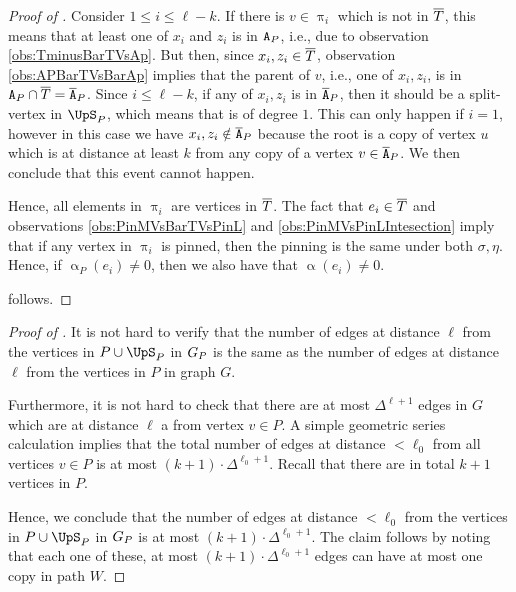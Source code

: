 \documentclass[11pt,reqno]{amsart}
\numberwithin{equation}{section}
\newcommand{\applegreen}[1]{ {\color{applegreen}#1}}
\newcommand{\blue}[1]{{\color{blue}#1}}
\newcommand{\bluepigment}[1]{{\color{blue(pigment)}#1}}
\newcommand{\capri}[1]{{\color{capri}#1}}
\newcommand{\cadmiumgreen}[1]{{\color{cadmiumgreen}#1}}
\newcommand{\electricviolet}[1]{{\color{electricviolet}#1}}
\newcommand{\goldenbrown}[1]{{\color{goldenbrown}#1}}
\newcommand{\heliotrope}[1]{{\color{heliotrope}#1}}
\newcommand{\red}[1]{{\color{red}#1}}
\newcommand{\maxDeg}{{\Delta}}
\renewcommand{\applegreen}[1]{#1}
\renewcommand{\blue}[1]{#1}
\renewcommand{\bluepigment}[1]{#1}
\renewcommand{\capri}[1]{#1}
\renewcommand{\cadmiumgreen}[1]{#1}
\renewcommand{\electricviolet}[1]{#1}
\renewcommand{\goldenbrown}[1]{#1}
\renewcommand{\heliotrope}[1]{#1}
\renewcommand{\red}[1]{#1}
\newcommand{\ke}{\blue{e}}
\newcommand{\ki}{\capri{i}}
\newcommand{\kk}{\bluepigment{k}}
\newcommand{\kell}{{\color{green(pigment)}\ell}}%
\newcommand{\kP}{\goldenbrown{P}}
\newcommand{\ku}{\red{u}}
\newcommand{\kv}{\electricviolet{v}}
\newcommand{\kW}{\blue{W}}
\newcommand{\kx}{\heliotrope{x}}
\newcommand{\kz}{\cadmiumgreen{z}}
\renewcommand{\ke}{e}
\renewcommand{\ki}{i}
\renewcommand{\kk}{k}
\renewcommand{\kell}{\ell}
\renewcommand{\kP}{P}
\renewcommand{\ku}{u}
\renewcommand{\kv}{v}
\renewcommand{\kW}{W}
\renewcommand{\kx}{x}
\renewcommand{\kz}{z}
\newcommand{\infweight}{\upalpha}
\begin{document}
\begin{proof}[Proof of ]
%
Consider $1\leq \ki \leq \kell-\kk$. If there is $\kv\in \uppi_{\ki}$ which  is not in $\SMTPu$, this means that at least one of 
$\kx_{\ki}$ and $\kz_{\ki}$ is  in $\cpT$, i.e., due to observation \ref{obs:TminusBarTVsAp}. 
But then, since $\kx_{\ki},\kz_{\ki}\in \SMTPu$,  observation \ref{obs:APBarTVsBarAp} implies  that the parent of $\kv$, i.e., one of  $\kx_{\ki}, \kz_{\ki}$, 
is in $\cpT\cap \SMTPu=\cpTP$. 
Since $i\leq \kell-\kk$,  if any of $\kx_{\ki},\kz_{\ki}$  is in  $\cpTP$, then it should be  a split-vertex in $\ssplit_{\kP}$, which means that is of degree $1$. 
This can only happen if $\ki=1$, however in this case we  have  $\kx_{\ki},\kz_{\ki}\notin \cpTP$ because the root is a copy of vertex $\ku$ which is
at distance at least $\kk$ from any copy of a vertex $\kv\in \cpTP$. We then conclude that this event cannot happen. 

Hence,  all elements in $\uppi_{\ki}$ are vertices in $\SMTPu$. The fact that $\ke_{\ki}\in \SMTPu$ and 
observations \ref{obs:PinMVsBarTVsPinL} and \ref{obs:PinMVsPinLIntesection} imply that  if any vertex in $\uppi_{\ki}$ is pinned, then the
pinning is the same under both $\sigma,\eta$. Hence,  if  $\infweight_{\kP}(\ke_{\ki})\neq 0$, then we also have that $\infweight(\ke_{\ki})\neq 0$. 

 follows. 
\end{proof}



\begin{proof}[Proof of ]
It is not hard to verify that the number of edges at distance $\kell$ from the vertices in $\kP\cup \ssplit_{\kP}$ in $\gext{G}{\kP}$ is 
 the same  as the number of edges at distance $\kell$ from the vertices  in $\kP$ in graph $G$. 



Furthermore, it is not hard to check that there are at most $\maxDeg^{\kell+1}$ edges in $G$ which are at distance 
$\kell$ a from vertex $\kv\in \kP$. A simple geometric series calculation implies that the total number of edges at 
distance $<\ell_0$ from all  vertices $\kv\in \kP$ is at most $(\kk+1)\cdot \maxDeg^{\ell_0+1}$. Recall that there 
are in total $\kk+1$ vertices in $\kP$. 


Hence, we conclude that the number of edges at distance $<\ell_0$ from the vertices in $\kP\cup \ssplit_{\kP}$ in 
$\gext{G}{\kP}$ is  at most $(\kk+1)\cdot \maxDeg^{\ell_0+1}$.  The claim follows by noting that each one of these, 
at most $(\kk+1)\cdot \maxDeg^{\ell_0+1}$ edges can have at  most one copy in path $\kW$. 
\end{proof}
\end{document}
